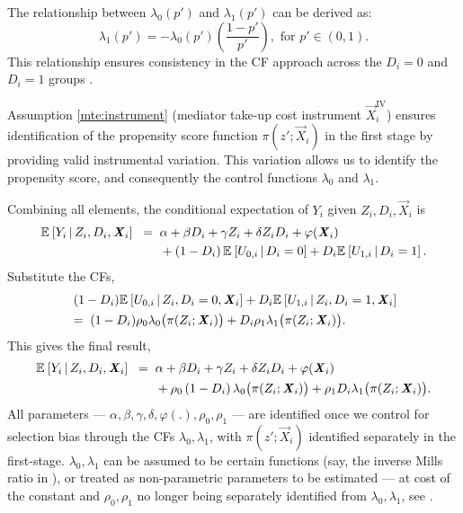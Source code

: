 The relationship between $\lambda_0(p')$ and $\lambda_1(p')$ can be derived as:
\[ \lambda_1 \left(p'\right) = -\lambda_0 \left(p'\right) \left( \frac{1-p'}{p'} \right), \text{ for } p' \in (0,1). \]
This relationship ensures consistency in the CF approach across the $D_i=0$ and $D_i= 1$ groups \citep{kline2019heckits}.

Assumption \ref{mte:instrument} (mediator take-up cost instrument $\vec X_i^{\text{IV}}$) ensures identification of the propensity score function $\pi(z'; \vec X_i)$ in the first stage by providing valid instrumental variation.
This variation allows us to identify the propensity score, and consequently the control functions $\lambda_0$ and $\lambda_1$.

Combining all elements, the conditional expectation of $Y_i$ given $Z_i, D_i, \vec X_i$ is
\begin{align*}
    \mathbb{E}_{} \left[ Y_i \, \middle\vert \, Z_i, D_i, \boldsymbol{\mathit{X}}_i \right] \;\; =& \;\;
        \alpha
        + \beta D_i
        + \gamma Z_i
        + \delta Z_i D_i
        + \varphi(\boldsymbol{\mathit{X}}_i) \\
        & \;\; + \left( 1 - D_i \right) \mathbb{E}_{} \left[ U_{0,i} \, \middle\vert \, D_i = 0 \right]
            + D_i \mathbb{E}_{} \left[ U_{1,i} \, \middle\vert \, D_i = 1 \right].
\end{align*}
Substitute the CFs,
\begin{align*}
    &\;(1-D_i) \mathbb{E}_{} \left[  U_{0,i}  \, \middle\vert \, Z_i, D_i=0, \boldsymbol{\mathit{X}}_i \right]
        + D_i \mathbb{E}_{} \left[  U_{1,i} \, \middle\vert \, Z_i, D_i=1, \boldsymbol{\mathit{X}}_i \right] \\
    &=\; (1-D_i)\rho_0 \lambda_0 \big(\pi(Z_i; \boldsymbol{\mathit{X}}_i) \big)
    + D_i \rho_1 \lambda_1 \big(\pi(Z_i; \boldsymbol{\mathit{X}}_i) \big).
\end{align*}
This gives the final result,
\begin{align*}
    \mathbb{E}_{} \left[ Y_i \, \middle\vert \, Z_i, D_i, \boldsymbol{\mathit{X}}_i \right] \;\; =& \;\;
        \alpha
        + \beta D_i
        + \gamma Z_i
        + \delta Z_i D_i
        + \varphi(\boldsymbol{\mathit{X}}_i) \\
        & \;\; +  \rho_0 \left( 1 - D_i \right) \lambda_0 \big( \pi(Z_i ; \boldsymbol{\mathit{X}}_i) \big)
            + \rho_1 D_i \lambda_1 \big( \pi(Z_i ; \boldsymbol{\mathit{X}}_i) \big).
\end{align*}
All parameters --- $\alpha, \beta, \gamma, \delta, \varphi(.), \rho_0, \rho_1$ --- are identified once we control for selection bias through the CFs $\lambda_0, \lambda_1$, with $\pi(z';\vec X_i)$ identified separately in the first-stage.
$\lambda_0, \lambda_1$ can be assumed to be certain functions (say, the inverse Mills ratio in \citealt{heckman1979sample}), or treated as non-parametric parameters to be estimated --- at cost of the constant and $\rho_0, \rho_1$ no longer being separately identified from $\lambda_0, \lambda_1$, see .

